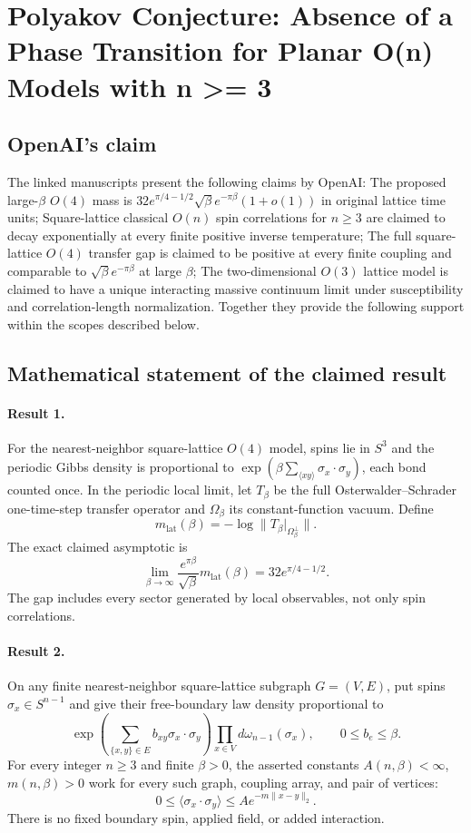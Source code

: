 \documentclass[11pt]{article}
\begin{document}
\section*{Polyakov Conjecture: Absence of a Phase Transition for Planar O(n) Models with n >= 3}

\subsection{OpenAI's claim}
The linked manuscripts present the following claims by OpenAI: The proposed large-$\beta$ $O(4)$ mass is $32e^{\pi/4-1/2}\sqrt\beta e^{-\pi\beta}(1+o(1))$ in original lattice time units; Square-lattice classical $O(n)$ spin correlations for $n\geq3$ are claimed to decay exponentially at every finite positive inverse temperature; The full square-lattice $O(4)$ transfer gap is claimed to be positive at every finite coupling and comparable to $\sqrt\beta e^{-\pi\beta}$ at large $\beta$; The two-dimensional $O(3)$ lattice model is claimed to have a unique interacting massive continuum limit under susceptibility and correlation-length normalization. Together they provide the following support within the scopes described below.

\subsection{Mathematical statement of the claimed result}
\paragraph{Result 1.} For the nearest-neighbor square-lattice \(O(4)\) model, spins lie in \(S^3\) and the periodic Gibbs density is proportional to \(\exp(\beta\sum_{\langle xy\rangle}\sigma_x\cdot\sigma_y)\), each bond counted once. In the periodic local limit, let \(T_\beta\) be the full Osterwalder--Schrader one-time-step transfer operator and \(\Omega_\beta\) its constant-function vacuum. Define
\[
 m_{\mathrm{lat}}(\beta)=-\log\|T_\beta|_{\Omega_\beta^\perp}\|.
\]
The exact claimed asymptotic is
\[
 \lim_{\beta\to\infty}\frac{e^{\pi\beta}}{\sqrt\beta}m_{\mathrm{lat}}(\beta)
 =32e^{\pi/4-1/2}.
\]
The gap includes every sector generated by local observables, not only spin correlations.

\paragraph{Result 2.} On any finite nearest-neighbor square-lattice subgraph \(G=(V,E)\), put spins \(\sigma_x\in S^{n-1}\) and give their free-boundary law density proportional to
\[
 \exp\!\left(\sum_{\{x,y\}\in E}b_{xy}\sigma_x\cdot\sigma_y\right)
 \prod_{x\in V}d\omega_{n-1}(\sigma_x),\qquad 0\le b_e\le\beta.
\]
For every integer \(n\ge3\) and finite \(\beta>0\), the asserted constants \(A(n,\beta)<\infty\), \(m(n,\beta)>0\) work for every such graph, coupling array, and pair of vertices:
\[
 0\le\langle\sigma_x\cdot\sigma_y\rangle\le A e^{-m\|x-y\|_2}.
\]
There is no fixed boundary spin, applied field, or added interaction.
\end{document}
